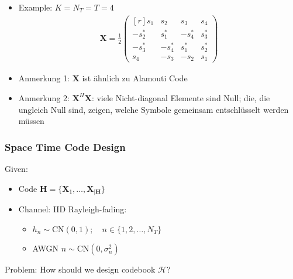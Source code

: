 \documentclass[a4paper, 10pt]{article}
\begin{document}
\begin{itemize}
\begin{itemize}
\begin{itemize}
			\item Example: $K = N_T = T = 4$
			\begin{align*}
				\textbf{X} = \frac{1}{2}
				\begin{pmatrix*}[r]
					s_1 & s_2 & s_3 & s_4\\
					-s_2^* & s_1^* & -s_4^* & s_3^*\\
					-s_3^* & -s_4^* & s_1^* & s_2^*\\
					s_4 & -s_3 & -s_2 & s_1
				\end{pmatrix*}
			\end{align*}
			\item Anmerkung 1:  $\textbf{X} $ ist \"ahnlich zu Alamouti Code
			\item Anmerkung 2: $\textbf{X}^H\textbf{X}$: viele Nicht-diagonal Elemente sind Null; die, die ungleich Null sind, zeigen, welche Symbole gemeinsam entschl\"usselt werden m\"ussen 		
		\end{itemize}
	\end{itemize}
\end{itemize}
\subsubsection*{Space Time Code Design}
Given: 
\begin{itemize}
	\item Code  $\mathscr{\textbf{H}} = \bigl\{\textbf{X}_1,\dots ,\textbf{X}_{|\mathscr{\textbf{H}}}\bigr\}$
	\item Channel: IID Rayleigh-fading: 
	\begin{itemize}
		\item $h_n \sim \text{CN}(0,1);\quad n \in \{1, 2, \dots , N_T \} $
		\item AWGN $ n \sim \text{CN}(0,\sigma _n^2) $
	\end{itemize}
\end{itemize}
Problem: How should we design codebook $\mathscr{H}$?
\end{document}
